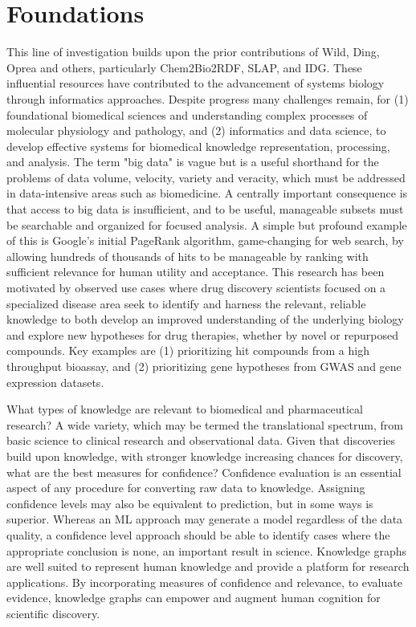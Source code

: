 \section{Foundations}

This line of investigation builds upon the prior contributions of Wild, Ding, Oprea and others, particularly Chem2Bio2RDF\cite{Chen2010-to}, SLAP\cite{Chen2012-iq}, and IDG\cite{Oprea2018-cp}. These influential resources have contributed to the advancement of systems biology through informatics approaches. Despite progress many challenges remain, for (1) foundational biomedical sciences and understanding complex processes of molecular physiology and pathology, and (2) informatics and data science, to develop effective systems for biomedical knowledge representation, processing, and analysis.  The term "big data" is vague but is a useful shorthand for the problems of data volume, velocity, variety and veracity, which must be addressed in data-intensive areas such as biomedicine.  A centrally important consequence is that access to big data is insufficient, and to be useful, manageable subsets must be searchable and organized for focused analysis.  A simple but profound example of this is Google's initial PageRank algorithm, game-changing for web search, by allowing hundreds of thousands of hits to be manageable by ranking with sufficient relevance for human utility and acceptance.  This research has been motivated by observed use cases where drug discovery scientists focused on a specialized disease area seek to identify and harness the relevant, reliable knowledge to both develop an improved understanding of the underlying biology and explore new hypotheses for drug therapies, whether by novel or repurposed compounds. Key examples are (1) prioritizing hit compounds from a high throughput bioassay, and (2) prioritizing gene hypotheses from GWAS and gene expression datasets.

What types of knowledge are relevant to biomedical and pharmaceutical research?  A wide variety, which may be termed the translational spectrum, from basic science to clinical research and observational data. Given that discoveries build upon knowledge, with stronger knowledge increasing chances for discovery, what are the best measures for confidence?  Confidence evaluation is an essential aspect of any procedure for converting raw data to knowledge.  Assigning confidence levels may also be equivalent to prediction, but in some ways is superior.  Whereas an ML approach may generate a model regardless of the data quality, a confidence level approach should be able to identify cases where the appropriate conclusion is none, an important result in science. Knowledge graphs are well suited to represent human knowledge and provide a platform for research applications. By incorporating measures of confidence and relevance, to evaluate evidence, knowledge graphs can empower and augment human cognition for scientific discovery.

